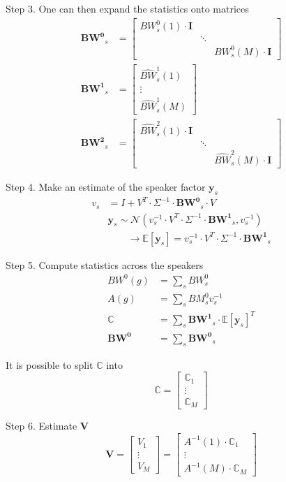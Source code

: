 Step 3. One can then expand the statistics onto matrices
\begin{align*}
    \bm{BW^0}_s &= \begin{bmatrix} BW^0_s(1) \cdot \bm{I} &  &  \\  & \ddots &  \\ & & BW^0_s(M) \cdot \bm{I} \end{bmatrix} \\
    \bm{BW^1}_s &= \begin{bmatrix} \hat{BW}^1_s(1) \\ \vdots \\ \hat{BW}^1_s(M) \end{bmatrix} \\
    \bm{BW^2}_s &= \begin{bmatrix} \hat{BW}^2_s(1) \cdot \bm{I} &  &  \\  & \ddots &  \\ & & \hat{BW}^2_s(M) \cdot \bm{I} \end{bmatrix}
\end{align*}

Step 4. Make an estimate of the speaker factor $\bm{y}_s$
\begin{align*}
    v_s &= I + V^T \cdot \Sigma^{-1} \cdot \bm{BW^0}_s \cdot V \\
    &\bm{y}_s \sim \mathcal{N}(v_s^{-1} \cdot V^T \cdot \Sigma^{-1} \cdot \bm{BW^1}_s , v_s^{-1}) \\
    &\quad \quad \rightarrow \mathbb{E}[\bm{y}_s] = v_s^{-1} \cdot V^T \cdot \Sigma^{-1} \cdot \bm{BW^1}_s
\end{align*}

Step 5. Compute statistics across the speakers
\begin{align*}
    BW^0(g) &= \sum_s BW^0_s \\
    A(g) &= \sum_s BM^0_s v_s^{-1} \\
    \mathbb{C} &= \sum_s \bm{BW^1}_s \cdot \mathbb{E}[\bm{y}_s]^T \\
    \bm{BW^0} &= \sum_s \bm{BW^0}_s
\end{align*}

It is possible to split $\mathbb{C}$ into
$$\mathbb{C} = \begin{bmatrix} \mathbb{C}_1 \\ \vdots \\ \mathbb{C}_M \end{bmatrix} $$

Step 6. Estimate $\bm{V}$
$$\bm{V} = \begin{bmatrix} V_1 \\ \vdots \\ V_M \end{bmatrix} = \begin{bmatrix} A^{-1}(1) \cdot \mathbb{C}_1 \\ \vdots \\  A^{-1}(M) \cdot \mathbb{C}_M  \end{bmatrix}$$

